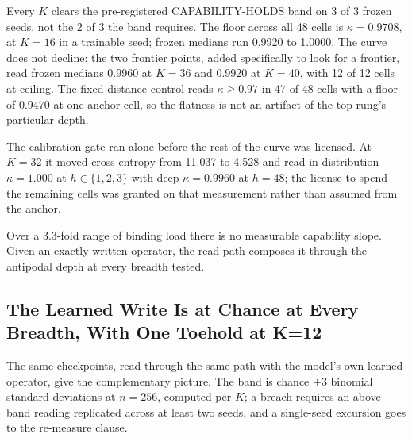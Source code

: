 Every $K$ clears the pre-registered CAPABILITY-HOLDS band on 3 of 3
frozen seeds, not the 2 of 3 the band requires. The floor across all 48
cells is $\kappa = 0.9708$, at $K{=}16$ in a trainable seed; frozen
medians run 0.9920 to 1.0000. The curve does not decline: the two
frontier points, added specifically to look for a frontier, read frozen
medians 0.9960 at $K{=}36$ and 0.9920 at $K{=}40$, with 12 of 12 cells
at ceiling. The fixed-distance control reads $\kappa \geq 0.97$ in 47 of
48 cells with a floor of 0.9470 at one anchor cell, so the flatness is
not an artifact of the top rung's particular depth.

The calibration gate ran alone before the rest of the curve was
licensed. At $K{=}32$ it moved cross-entropy from 11.037 to 4.528 and
read in-distribution $\kappa = 1.000$ at $h \in \{1,2,3\}$ with deep
$\kappa = 0.9960$ at $h{=}48$; the license to spend the remaining cells
was granted on that measurement rather than assumed from the anchor.

Over a 3.3-fold range of binding load there is no measurable capability
slope. Given an exactly written operator, the read path composes it
through the antipodal depth at every breadth tested.

\subsection{The Learned Write Is at Chance at Every Breadth, With One Toehold at K=12}

The same checkpoints, read through the same path with the model's own
learned operator, give the complementary picture. The band is chance
$\pm 3$ binomial standard deviations at $n{=}256$, computed per $K$; a
breach requires an above-band reading replicated across at least two
seeds, and a single-seed excursion goes to the re-measure clause.

